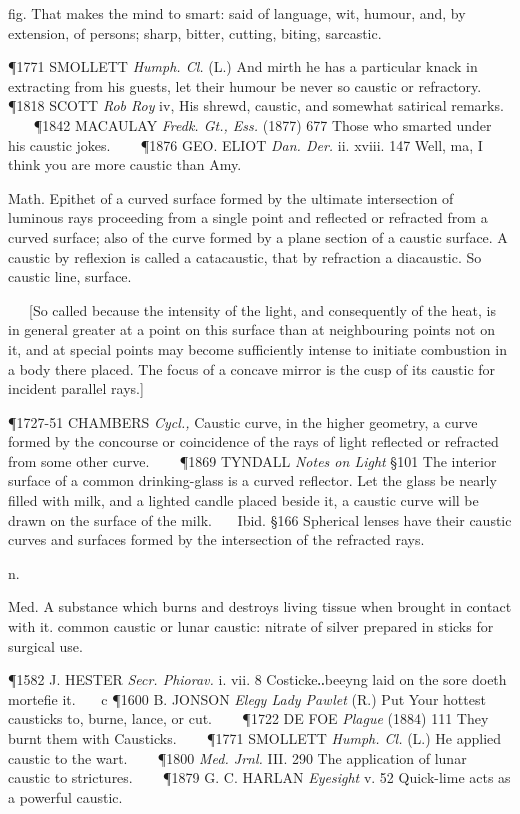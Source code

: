 \begin{description}[wide, labelwidth=!, labelindent=0pt]
\begin{myenumerate}
 fig. That makes the mind to smart: said of language, wit, humour, and, by extension, of persons; sharp, bitter, cutting, biting, sarcastic.

\P 1771 SMOLLETT  \textit{Humph. Cl.} (L.) And mirth he has a particular knack in extracting from his guests, let their humour be never so caustic or refractory.    
\P 1818 SCOTT  \textit{Rob Roy} iv, His shrewd, caustic, and somewhat satirical remarks.    
\P 1842 MACAULAY  \textit{Fredk. Gt., Ess.} (1877) 677 Those who smarted under his caustic jokes.    
\P 1876 GEO. ELIOT  \textit{Dan. Der.} ii. xviii. 147 Well, ma, I think you are more caustic than Amy.

 Math. Epithet of a curved surface formed by the ultimate intersection of luminous rays proceeding from a single point and reflected or refracted from a curved surface; also of the curve formed by a plane section of a caustic surface. A caustic by reflexion is called a catacaustic, that by refraction a diacaustic. So caustic line, surface.

   [So called because the intensity of the light, and consequently of the heat, is in general greater at a point on this surface than at neighbouring points not on it, and at special points may become sufficiently intense to initiate combustion in a body there placed. The focus of a concave mirror is the cusp of its caustic for incident parallel rays.]

\P 1727-51 CHAMBERS  \textit{Cycl.,} Caustic curve, in the higher geometry, a curve formed by the concourse or coincidence of the rays of light reflected or refracted from some other curve.    
\P 1869 TYNDALL  \textit{Notes on Light} §101 The interior surface of a common drinking-glass is a curved reflector. Let the glass be nearly filled with milk, and a lighted candle placed beside it, a caustic curve will be drawn on the surface of the milk.    Ibid. §166 Spherical lenses have their caustic curves and surfaces formed by the intersection of the refracted rays.

 n.

 Med. A substance which burns and destroys living tissue when brought in contact with it. common caustic or lunar caustic: nitrate of silver prepared in sticks for surgical use.

\P 1582 J. HESTER  \textit{Secr. Phiorav.} i. vii. 8 Costicke‥beeyng laid on the sore doeth mortefie it.    c 
\P 1600 B. JONSON  \textit{Elegy Lady Pawlet} (R.) Put Your hottest causticks to, burne, lance, or cut.    
\P 1722 DE FOE  \textit{Plague} (1884) 111 They burnt them with Causticks.    
\P 1771 SMOLLETT  \textit{Humph. Cl.} (L.) He applied caustic to the wart.    
\P 1800  \textit{Med. Jrnl.} III. 290 The application of lunar caustic to strictures.    
\P 1879 G. C. HARLAN  \textit{Eyesight} v. 52 Quick-lime acts as a powerful caustic.


\end{myenumerate}
\end{description}
